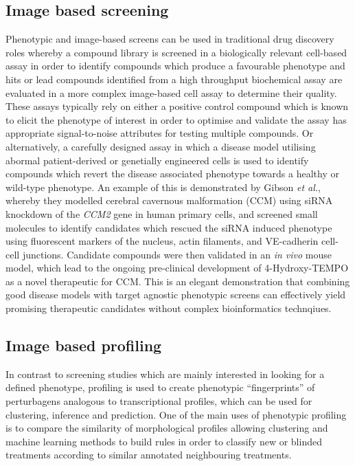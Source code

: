 \documentclass[a4paper,11pt,twoside,openright]{scrbook}
\begin{document}
\subsection{Image based screening}

Phenotypic and image-based screens can be used in traditional drug discovery roles whereby a compound library is screened in a biologically relevant cell-based assay in order to identify compounds which produce a favourable phenotype and hits or lead compounds identified from a high throughput biochemical assay are evaluated in a more complex image-based cell assay to determine their quality.
These assays typically rely on either a positive control compound which is known to elicit the phenotype of interest in order to optimise and validate the assay has appropriate signal-to-noise attributes for testing multiple compounds.
Or alternatively, a carefully designed assay in which a disease model utilising abormal patient-derived or genetially engineered cells is used to identify compounds which revert the disease associated phenotype towards a healthy or wild-type phenotype.
An example of this is demonstrated by Gibson \textit{et al.}, \cite{Gibson2015} whereby they modelled cerebral cavernous malformation (CCM) using siRNA knockdown of the \textit{CCM2} gene in human primary cells, and screened small molecules to identify candidates which rescued the siRNA induced phenotype using fluorescent markers of the nucleus, actin filaments, and VE-cadherin cell-cell junctions.
Candidate compounds were then validated in an \textit{in vivo} mouse model, which lead to the ongoing pre-clinical development of 4-Hydroxy-TEMPO as a novel therapeutic for CCM.
This is an elegant demonstration that combining good disease models with target agnostic phenotypic screens can effectively yield promising therapeutic candidates without complex bioinformatics technqiues.

\subsection{Image based profiling}
In contrast to screening studies which are mainly interested in looking for a defined phenotype, profiling is used to create phenotypic ``fingerprints'' of perturbagens analogous to transcriptional profiles, which can be used for clustering, inference and prediction.
One of the main uses of phenotypic profiling is to compare the similarity of morphological profiles allowing clustering and machine learning methods to build rules in order to classify new or blinded treatments according to similar annotated neighbouring treatments.
\end{document}
